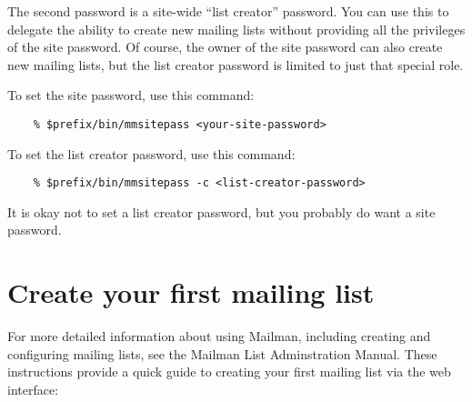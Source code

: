 \documentclass{howto}
\begin{document}
The second password is a site-wide ``list creator'' password.  You can use
this to delegate the ability to create new mailing lists without providing all
the privileges of the site password.  Of course, the owner of the site
password can also create new mailing lists, but the list creator password is
limited to just that special role.

To set the site password, use this command:

\begin{verbatim}
    % $prefix/bin/mmsitepass <your-site-password>
\end{verbatim}

To set the list creator password, use this command:

\begin{verbatim}
    % $prefix/bin/mmsitepass -c <list-creator-password>
\end{verbatim}

It is okay not to set a list creator password, but you probably do want a site
password.

\section{Create your first mailing list}

For more detailed information about using Mailman, including creating and
configuring mailing lists, see the Mailman List Adminstration Manual.  These
instructions provide a quick guide to creating your first mailing list via the
web interface:
\end{document}
